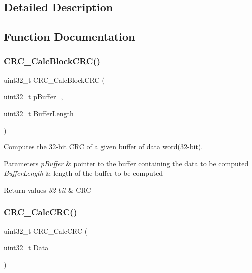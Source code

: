 \subsection{Detailed Description}


\subsection{Function Documentation}
\mbox{\label{group___c_r_c___exported___functions_gab15ebf620615c360048fb4f45b15fae6}} 
\subsubsection{\texorpdfstring{CRC\_CalcBlockCRC()}{CRC\_CalcBlockCRC()}}
{\footnotesize\ttfamily uint32\+\_\+t C\+R\+C\+\_\+\+Calc\+Block\+C\+RC (\begin{DoxyParamCaption}\item[{uint32\+\_\+t}]{p\+Buffer\mbox{[}$\,$\mbox{]},  }\item[{uint32\+\_\+t}]{Buffer\+Length }\end{DoxyParamCaption})}



Computes the 32-\/bit C\+RC of a given buffer of data word(32-\/bit). 


\begin{DoxyParams}{Parameters}
{\em p\+Buffer} & pointer to the buffer containing the data to be computed \\
\hline
{\em Buffer\+Length} & length of the buffer to be computed\\
\hline
\end{DoxyParams}

\begin{DoxyRetVals}{Return values}
{\em 32-\/bit} & C\+RC \\
\hline
\end{DoxyRetVals}
\mbox{\label{group___c_r_c___exported___functions_ga5407fdbb8e8c9be6322cc8856ae5db3b}} 
\subsubsection{\texorpdfstring{CRC\_CalcCRC()}{CRC\_CalcCRC()}}
{\footnotesize\ttfamily uint32\+\_\+t C\+R\+C\+\_\+\+Calc\+C\+RC (\begin{DoxyParamCaption}\item[{uint32\+\_\+t}]{Data }\end{DoxyParamCaption})}



